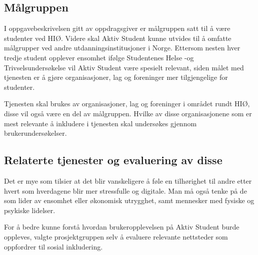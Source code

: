 \subsection{Målgruppen}
I oppgavebeskrivelsen gitt av oppdragsgiver er målgruppen satt til å være studenter ved HIØ. Videre skal Aktiv Student kunne utvides til å omfatte målgrupper ved andre utdanningsinstitusjoner i Norge. 
Ettersom nesten hver tredje student opplever ensomhet ifølge Studentenes Helse -og Trivselsundersøkelse \cite{SHOT:2} vil Aktiv Student være spesielt relevant, siden målet med tjenesten er å gjøre organisasjoner, lag og foreninger mer tilgjengelige for studenter.

Tjenesten skal brukes av organisasjoner, lag og foreninger i området rundt HIØ, disse vil også være en del av målgruppen. Hvilke av disse organisasjonene som er mest relevante å inkludere i tjenesten skal undersøkes gjennom brukerundersøkelser.

\subsection{Relaterte tjenester og evaluering av disse}
\label{section:relaterte-tjenester}

Det er mye som tilsier at det blir vanskeligere å føle en tilhørighet til andre etter hvert som hverdagene blir mer stressfulle og digitale. Man må også tenke på de som lider av ensomhet eller økonomisk utrygghet, samt mennesker med fysiske og psykiske lidelser.

\vspace{5mm} %

For å bedre kunne forstå hvordan brukeropplevelsen på Aktiv Student burde oppleves, valgte prosjektgruppen selv å evaluere relevante nettsteder som oppfordrer til sosial inkludering. 

\vspace{5mm} %

